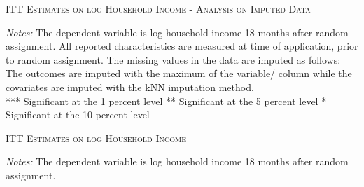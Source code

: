 \begin{appendices}
\newpage
\begin{table}[H]
\centering
\caption{\textsc{ITT Estimates on log Household Income - Analysis on Imputed Data}}



\medskip
\begin{adjustbox}{width=0.825\textwidth, totalheight=\textheight, keepaspectratio}

\end{adjustbox}

\label{tab:table_kNN_max_withcontr}
\bigskip
\raggedright
\footnotesize
\textit{Notes:} The dependent variable is log household income 18 months after random assignment. All reported characteristics are measured at time of application, prior to random assignment. The missing values in the data are imputed as follows: The outcomes are imputed with the maximum of the variable/ column while the covariates are imputed with the \ac{kNN} imputation method. \\
*** Significant at the 1 percent level ** Significant at the 5 percent level * Significant at the 10 percent level
\end{table}

\newpage
\begin{table}[h!]
\centering
\caption{\textsc{ITT Estimates on log Household Income}}
\addtolength{\tabcolsep}{24pt}

\addtolength{\tabcolsep}{-24pt}

\medskip


\label{tab:table_complete_nocontr}
\bigskip
\raggedright
\footnotesize
\textit{Notes:} The dependent variable is log household income 18 months after random assignment. \\
\end{table}

\end{appendices}
